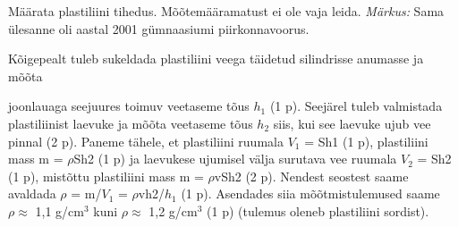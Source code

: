 
Määrata plastiliini tihedus. Mõõtemääramatust ei ole vaja leida.
\textit{Märkus:} Sama ülesanne oli aastal 2001 gümnaasiumi piirkonnavoorus.

\hint

\solu
Kõigepealt tuleb sukeldada plastiliini veega täidetud silindrisse anumasse ja mõõta

joonlauaga seejuures toimuv veetaseme tõus $h_1$ (1 p). Seejärel tuleb valmistada plastiliinist laevuke ja mõõta veetaseme tõus $h_2$ siis, kui see laevuke ujub vee pinnal (2 p). Paneme tähele, et plastiliini ruumala $V_1$ = Sh1 (1 p), plastiliini mass m = $\rho$Sh2 (1 p) ja laevukese ujumisel välja surutava vee ruumala $V_2$ = Sh2 (1 p), mistõttu plastiliini mass m = $\rho$vSh2 (2 p). Nendest seostest saame avaldada $\rho$ = m/$V_1$ = $\rho$vh2/$h_1$ (1 p). Asendades siia mõõtmistulemused saame $\rho \approx$ 1,1 g/cm$^3$ kuni $\rho \approx$ 1,2 g/cm$^3$ (1 p) (tulemus oleneb plastiliini sordist).
\probend
